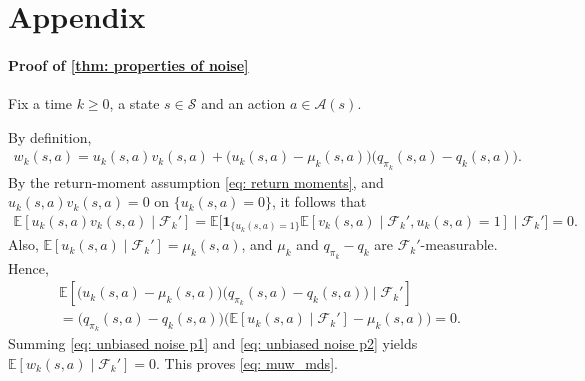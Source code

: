 \documentclass[twoside,11pt]{article}
\DeclareRobustCommand{\reviewbarstart}{%
  \ifhmode %
    \vadjust{\vbox to 0pt{%
      \vskip-\ht\strutbox %
      \vskip-\dp\strutbox %
      \cbstart[\changebarwidth] %
      \vss %
    }}%
  \else %
    \cbstart[\changebarwidth]%
  \fi %
} %
\providecommand{\DIFadd}[1]{#1} %
\providecommand{\DIFaddbegin}{\reviewbarstart} %
\providecommand{\DIFaddend}{\protect\cbend} %
\def\DIFadd#1{#1}%
\def\DIFaddbegin{}%
\def\DIFaddend{}%
\begin{document}
\clearpage


 \appendix
 \section*{Appendix}
\label{sec: Appendix}

 \paragraph{Proof of \autoref{thm: properties of noise}}

Fix a time $k\ge 0$, a state $s \in \mathcal S$ and an action $a \in \mathcal A(s)$.

By definition,
\begin{align}
\label{eq: noise def in appendix proof}
w_k(s,a) = u_k(s,a) v_k(s,a) + \big( u_k(s,a)-\mu_k(s,a) \big) \big( q_{\pi_k}(s,a) - q_k(s,a) \big).
\end{align}
 \DIFaddbegin \DIFadd{By the return-moment assumption \eqref{eq: return moments}}\DIFaddend ,
and $u_k(s,a) v_k(s,a) = 0$ on $\{u_k(s,a)=0\}$,
it follows that
 \DIFaddbegin \begin{align}
\DIFadd{\label{eq: unbiased noise p1}
\mathbb E}[ \DIFadd{u_k(s,a) v_k(s,a) \mid \mathcal F_k'}]
\DIFadd{=
\mathbb E \big[
    \mathbf 1_{\{u_k(s,a)=1\}} \mathbb E}[ \DIFadd{v_{k}(s,a) \mid \mathcal F_k', u_k(s,a)=1}]
    \DIFadd{\mid \mathcal F_k' \big]
= 0 .
}\end{align}\DIFaddend 
Also, $\mathbb E[u_k(s,a) \mid \mathcal F_k'] = \mu_k(s,a)$, and $\mu_k$ and $q_{\pi_k}-q_k$ are $\mathcal F_k'$-measurable. Hence,
\begin{multline}
\label{eq: unbiased noise p2}
\mathbb E \!\left[
\bigl( u_k(s,a)-\mu_k(s,a) \bigr) \bigl( q_{\pi_k}(s,a)-q_k(s,a) \bigr)
\mid \mathcal F_k'
\right]
\\
=
\big( q_{\pi_k}(s,a)-q_k(s,a) \big)
\big( \mathbb E\!\left[ u_k(s,a) \mid \mathcal F_k'
\right]
-\mu_k(s,a) \big)
=
0 .
\end{multline}
Summing \eqref{eq: unbiased noise p1} and \eqref{eq: unbiased noise p2} yields $\mathbb E[w_k(s,a) \mid \mathcal F_k'] = 0$.
 \DIFaddbegin \DIFadd{This proves \eqref{eq: muw_mds}.
}\DIFaddend 
\end{document}

